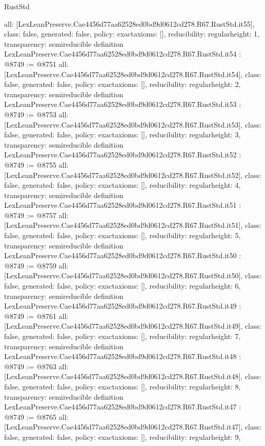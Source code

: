 \begin{lexlean}{RustStd}
\begin{coremodule}
{  all: [LexLeanPreserve.Cae4456d77aa62528ed0bd9d0612cd278.R67.RustStd.it55],
  class: false,
  generated: false,
  policy: exact{axioms: []},
  reducibility: regular{height: 1},
  transparency: semireducible
}
definition LexLeanPreserve.Cae4456d77aa62528ed0bd9d0612cd278.R67.RustStd.it54 : @8749 := @8751 {
  all: [LexLeanPreserve.Cae4456d77aa62528ed0bd9d0612cd278.R67.RustStd.it54],
  class: false,
  generated: false,
  policy: exact{axioms: []},
  reducibility: regular{height: 2},
  transparency: semireducible
}
definition LexLeanPreserve.Cae4456d77aa62528ed0bd9d0612cd278.R67.RustStd.it53 : @8749 := @8753 {
  all: [LexLeanPreserve.Cae4456d77aa62528ed0bd9d0612cd278.R67.RustStd.it53],
  class: false,
  generated: false,
  policy: exact{axioms: []},
  reducibility: regular{height: 3},
  transparency: semireducible
}
definition LexLeanPreserve.Cae4456d77aa62528ed0bd9d0612cd278.R67.RustStd.it52 : @8749 := @8755 {
  all: [LexLeanPreserve.Cae4456d77aa62528ed0bd9d0612cd278.R67.RustStd.it52],
  class: false,
  generated: false,
  policy: exact{axioms: []},
  reducibility: regular{height: 4},
  transparency: semireducible
}
definition LexLeanPreserve.Cae4456d77aa62528ed0bd9d0612cd278.R67.RustStd.it51 : @8749 := @8757 {
  all: [LexLeanPreserve.Cae4456d77aa62528ed0bd9d0612cd278.R67.RustStd.it51],
  class: false,
  generated: false,
  policy: exact{axioms: []},
  reducibility: regular{height: 5},
  transparency: semireducible
}
definition LexLeanPreserve.Cae4456d77aa62528ed0bd9d0612cd278.R67.RustStd.it50 : @8749 := @8759 {
  all: [LexLeanPreserve.Cae4456d77aa62528ed0bd9d0612cd278.R67.RustStd.it50],
  class: false,
  generated: false,
  policy: exact{axioms: []},
  reducibility: regular{height: 6},
  transparency: semireducible
}
definition LexLeanPreserve.Cae4456d77aa62528ed0bd9d0612cd278.R67.RustStd.it49 : @8749 := @8761 {
  all: [LexLeanPreserve.Cae4456d77aa62528ed0bd9d0612cd278.R67.RustStd.it49],
  class: false,
  generated: false,
  policy: exact{axioms: []},
  reducibility: regular{height: 7},
  transparency: semireducible
}
definition LexLeanPreserve.Cae4456d77aa62528ed0bd9d0612cd278.R67.RustStd.it48 : @8749 := @8763 {
  all: [LexLeanPreserve.Cae4456d77aa62528ed0bd9d0612cd278.R67.RustStd.it48],
  class: false,
  generated: false,
  policy: exact{axioms: []},
  reducibility: regular{height: 8},
  transparency: semireducible
}
definition LexLeanPreserve.Cae4456d77aa62528ed0bd9d0612cd278.R67.RustStd.it47 : @8749 := @8765 {
  all: [LexLeanPreserve.Cae4456d77aa62528ed0bd9d0612cd278.R67.RustStd.it47],
  class: false,
  generated: false,
  policy: exact{axioms: []},
  reducibility: regular{height: 9},
}
\end{coremodule}
\end{lexlean}
